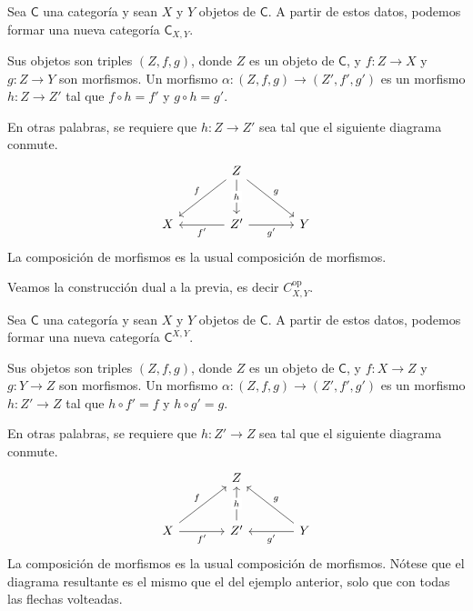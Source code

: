 \documentclass[../main.tex]{subfiles}
\begin{document}
\begin{exampleap}\label{prodcat}
    Sea $\mathsf{C}$ una categor\'ia y sean $X$ y $Y$ objetos de $\mathsf{C}$.
    A partir de estos datos, podemos formar una nueva categor\'ia $\mathsf{C}_{X,Y}$.

    Sus objetos son triples $(Z,f,g)$, donde $Z$ es un objeto de $\mathsf{C}$, y $f:Z \to X$ y $g:Z \to Y$ son morfismos.
    Un morfismo $\alpha: (Z, f , g) \to (Z', f',g')$ es un morfismo $h: Z \to Z'$ tal que $f \circ h = f'$ y $g \circ h = g'$.

    En otras palabras, se requiere que $h:Z \to Z'$ sea tal que el siguiente diagrama conmute.
    \[\begin{tikzcd}[row sep=large,column sep=large]
            & Z \\
            X & {Z'} & Y
            \arrow["f"', from=1-2, to=2-1]
            \arrow["{f'}", from=2-2, to=2-1]
            \arrow["g", from=1-2, to=2-3]
            \arrow["{g'}"', from=2-2, to=2-3]
            \arrow["h"{description}, from=1-2, to=2-2]
        \end{tikzcd}\]
    La composici\'on de morfismos es la usual composici\'on de morfismos.
\end{exampleap}

\begin{exampleap}\label{coprodcat}
    Veamos la construcci\'on dual a la previa, es decir $C^{\text{op}}_{X,Y}$.

    Sea $\mathsf{C}$ una categor\'ia y sean $X$ y $Y$ objetos de $\mathsf{C}$.
    A partir de estos datos, podemos formar una nueva categor\'ia $\mathsf{C}^{X,Y}$.

    Sus objetos son triples $(Z,f,g)$, donde $Z$ es un objeto de $\mathsf{C}$, y $f:X \to Z$ y $g:Y \to Z$ son morfismos.
    Un morfismo $\alpha: (Z, f , g) \to (Z', f', g')$ es un morfismo $h: Z' \to Z$ tal que $h \circ f' = f$ y $h \circ g' = g$.

    En otras palabras, se requiere que $h:Z' \to Z$ sea tal que el siguiente diagrama conmute.
    \[\begin{tikzcd}[row sep=large,column sep=large]
            & Z \\
            X & {Z'} & Y
            \arrow["f", from=2-1, to=1-2]
            \arrow["{f'}"', from=2-1, to=2-2]
            \arrow["g"', from=2-3, to=1-2]
            \arrow["{g'}", from=2-3, to=2-2]
            \arrow["h"{description}, from=2-2, to=1-2]
        \end{tikzcd}\]
    La composici\'on de morfismos es la usual composici\'on de morfismos. N\'otese que el diagrama resultante es el mismo que el del ejemplo anterior, solo que con todas las flechas volteadas.
\end{exampleap}
\end{document}
